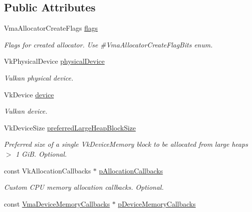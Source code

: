 \subsection*{Public Attributes}
\begin{DoxyCompactItemize}
\item 
\mbox{\label{structVmaAllocatorCreateInfo_a392ea2ecbaff93f91a7c49f735ad4346}} 
Vma\+Allocator\+Create\+Flags \hyperlink{structVmaAllocatorCreateInfo_a392ea2ecbaff93f91a7c49f735ad4346}{flags}
\begin{DoxyCompactList}\small\item\em Flags for created allocator. Use \#\+Vma\+Allocator\+Create\+Flag\+Bits enum. \end{DoxyCompactList}\item 
Vk\+Physical\+Device \hyperlink{structVmaAllocatorCreateInfo_a08230f04ae6ccf8a78150a9e829a7156}{physical\+Device}
\begin{DoxyCompactList}\small\item\em Vulkan physical device. \end{DoxyCompactList}\item 
Vk\+Device \hyperlink{structVmaAllocatorCreateInfo_ad924ddd77b04039c88d0c09b0ffcd500}{device}
\begin{DoxyCompactList}\small\item\em Vulkan device. \end{DoxyCompactList}\item 
Vk\+Device\+Size \hyperlink{structVmaAllocatorCreateInfo_a8e4714298e3121cdd8b214a1ae7a637a}{preferred\+Large\+Heap\+Block\+Size}
\begin{DoxyCompactList}\small\item\em Preferred size of a single {\ttfamily Vk\+Device\+Memory} block to be allocated from large heaps $>$ 1 GiB. Optional. \end{DoxyCompactList}\item 
const Vk\+Allocation\+Callbacks $\ast$ \hyperlink{structVmaAllocatorCreateInfo_a6e409087e3be55400d0e4ccbe43c608d}{p\+Allocation\+Callbacks}
\begin{DoxyCompactList}\small\item\em Custom C\+PU memory allocation callbacks. Optional. \end{DoxyCompactList}\item 
const \hyperlink{structVmaDeviceMemoryCallbacks}{Vma\+Device\+Memory\+Callbacks} $\ast$ \hyperlink{structVmaAllocatorCreateInfo_af1380969b5e1ea4c3184a877892d260e}{p\+Device\+Memory\+Callbacks}

\end{DoxyCompactItemize}
